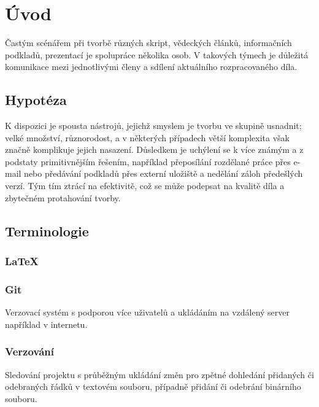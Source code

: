 \chapter{Úvod}
Častým scénářem při tvorbě různých skript, vědeckých článků, informačních podkladů, prezentací je spolupráce několika osob. V takových týmech je důležitá komunikace mezi jednotlivými členy a sdílení aktuálního rozpracovaného díla.

\section{Hypotéza}

K dispozici je spousta nástrojů, jejichž smyslem je tvorbu ve skupině usnadnit; velké množství, různorodost, a v některých případech větší komplexita však značně komplikuje jejich nasazení. Důsledkem je uchýlení se k více známým a z podstaty primitivnějším řešením, například přeposílání rozdělané práce přes e-mail nebo předávání podkladů přes externí uložiště a nedělání záloh předešlých verzí. Tým tím ztrácí na efektivitě, což se může podepsat na kvalitě díla a zbytečném protahování tvorby.

\section{Terminologie}

\subsection{\LaTeX}

 \cite{latex-def}

\subsection{Git}

Verzovací systém s podporou více uživatelů a ukládáním na vzdálený server například v internetu.

\subsection{Verzování}

Sledování projektu s průběžným ukládání změn pro zpětné dohledání přidaných či odebraných řádků v textovém souboru, případně přidání či odebrání binárního souboru.

